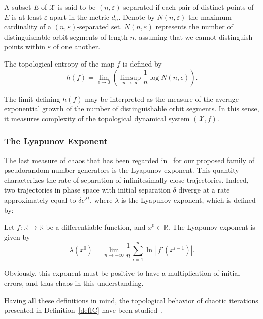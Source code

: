 A subset $E$ of $\mathcal{X}$ is said to be $(n,\varepsilon)$-separated 
if each pair of distinct points of $E$ is at least $\varepsilon$ apart 
in the metric $d_n$. Denote by $N(n, \varepsilon)$ the 
maximum cardinality of a $(n,\varepsilon)$-separated set. 
$N(n, \varepsilon)$ represents the number of distinguishable orbit 
segments of length $n$, assuming that we cannot distinguish points 
within $\varepsilon$ of one another. 

\begin{definition}
The topological 
entropy of the map $f$ is defined by
$$h(f)=\lim_{\epsilon\to 0} \left(\limsup_{n\to \infty} \frac{1}{n}
\log N(n,\epsilon)\right).$$
\end{definition}



The limit defining $h(f)$ may 
be interpreted as the measure of the average exponential growth of the 
number of distinguishable orbit segments. In this sense, it measures 
complexity of the topological dynamical system $(\mathcal{X}, f)$.

\subsubsection{The Lyapunov Exponent}


The last measure of chaos that has been regarded in~\cite{GuyeuxThese10} for our proposed family
of pseudorandom number generators is the Lyapunov exponent. This
quantity characterizes the rate of separation of infinitesimally close 
trajectories. Indeed, two trajectories in phase space with initial 
separation $\delta$ diverge at a rate approximately
equal to $\delta e^{\lambda t}$,
where $\lambda$ is the Lyapunov exponent, which is defined by:

\begin{definition}
Let $f:\mathds{R} \longrightarrow \mathds{R}$ be a differentiable
function, and $x^0\in \mathds{R}$. The Lyapunov exponent is given by
$$\lambda(x^0) = \displaystyle{\lim_{n \to +\infty} \dfrac{1}{n} \sum_{i=1}^n \ln \left| ~f'\left(x^{i-1}\right)\right|}.$$
\end{definition}

Obviously, this exponent must be positive to have a multiplication of
initial errors, and thus chaos in this understanding.

Having all these definitions in mind, the topological 
behavior of chaotic iterations presented in Definition~\ref{defIC}
have been studied~\cite{GuyeuxThese10}.

